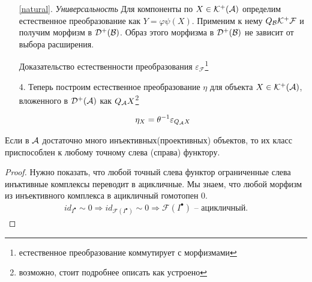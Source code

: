 \documentclass[../main.tex]{subfiles}
\begin{document}
\begin{itemize}
\item[ \ref{natural}.] \textit{Универсальность}
Для компоненты по $X \in \mathcal{K^+(A)}$ определим естественное преобразование как  $Y = \varphi\psi (X)$. Применим к нему $Q_{\mathcal{B}}\mathcal{K^+ F}$ и получим морфизм в $\mathcal{D^+(B)}$. Образ этого морфизма в $\mathcal{D^+(B)}$ не зависит от выбора расширения.
\bee
{}
\eee
Доказательство естественности преобразования $\varepsilon_{\mathcal{F}}$\footnote{естественное преобразование коммутирует с морфизмами}
\bee
{}
\eee
\bee
{}
\eee
\item[4.]Теперь построим естественное преобразование $\eta$ для объекта $X\in\mathcal{K^+(A)}$, вложенного в $\mathcal{D^+(A)}$ как $Q_{\mathcal{A}}X$\footnote{{\color{red}возможно, стоит подробнее описать как устроено }}
\bee
{}    
 \eee
 \begin{align*}
     \eta_{X} = \theta^{-1}\varepsilon_{Q_{\mathcal{A}}X}
 \end{align*}
 \end{itemize}
 \begin{to_claim}
Если в $\mathcal{A}$ достаточно много инъективных(проективных) объектов, то их класс приспособлен к любому точному слева (справа) функтору.
 \end{to_claim}
 \begin{proof}
 Нужно показать, что любой точный слева функтор ограниченные слева инъктивные комплексы переводит в ацикличные. Мы знаем, что любой морфизм из инъективного комплекса в ацикличный гомотопен 0. 
 \begin{align*}
     id_{I^\bullet} \sim 0 \Rightarrow id_{\mathcal{F}(I^\bullet)}\sim 0 \Rightarrow \mathcal{F}(I^\bullet) \text{ -- ацикличный.}
 \end{align*}
 \end{proof}
\end{document}
